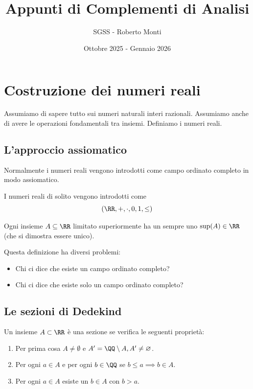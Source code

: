 \documentclass[11pt]{scrartcl}
\newcommand{\eset}{\varnothing}
\begin{document}
	\title{Appunti di Complementi di Analisi}
	\subtitle{SGSS - Roberto Monti}
	\date{Ottobre 2025 - Gennaio 2026}
	
	\maketitle
	
	\tableofcontents
	
	\newpage
	
	\section{Costruzione dei numeri reali}
	Assumiamo di sapere tutto sui numeri naturali interi razionali. Assumiamo anche di avere le operazioni fondamentali tra insiemi. Definiamo i numeri reali.
	\subsection{L'approccio assiomatico}
	Normalmente i numeri reali vengono introdotti come campo ordinato completo in modo assiomatico.
	\begin{definition}
		I numeri reali di solito vengono introdotti come 
		$$(\RR,+,\cdot,0,1,\le)$$
	\end{definition}
	\begin{proposition}
		Ogni insieme $A\subseteq \RR$ limitato superiormente ha un sempre uno $\sup(A)\in\RR$ (che si dimostra essere unico). 
	\end{proposition}
	Questa definizione ha diversi problemi:
	\begin{itemize}
		\item Chi ci dice che esiste un campo ordinato completo?
		\item Chi ci dice che esiste solo un campo ordinato completo?
	\end{itemize}
	
	\subsection{Le sezioni di Dedekind}
	
	\begin{definition}
		Un insieme $A\subset\RR$ è una sezione se verifica le seguenti proprietà:
		\begin{enumerate}
			\item Per prima cosa $A\ne\emptyset$ e $A'=\QQ\setminus A,A'\ne \eset$.
			\item Per ogni $a\in A$ e per ogni $b\in\QQ$ se $b\le a\implies b\in A$. 
			\item Per ogni $a\in A$ esiste un $b\in A$ con $b>a$.
		\end{enumerate}
	\end{definition}
	
\end{document}
